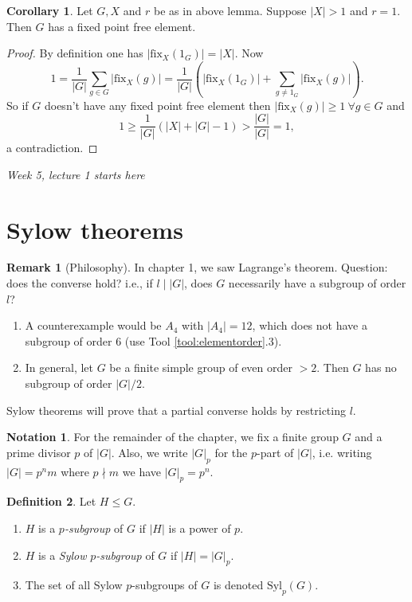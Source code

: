 \documentclass[a4paper]{article}
\newcommand{\Syl}{\text{Syl}}
\newcommand{\fix}{\text{fix}}
\theoremstyle{definition}
\newtheorem{defn}{Definition}[subsection]
\newtheorem{coro}[defn]{Corollary}
\newtheorem*{remark}{Remark}
\newtheorem*{notation}{Notation}
\begin{document}
\begin{coro}
Let $G,X$ and $r$ be as in above lemma. Suppose $|X|>1$ and $r=1$. Then $G$ has a fixed point free element.
\end{coro}
\begin{proof}
By definition one has $|\fix_X(1_G)|=|X|$. Now
\[
1=\frac{1}{|G|}\sum_{g\in G} |\fix_X(g)|=\frac{1}{|G|}\left(|\fix_X(1_G)|+\sum_{g\neq 1_G} |\fix_X(g)|\right).
\]
So if $G$ doesn't have any fixed point free element then $|\fix_X(g)|\geq 1 \ \forall g\in G$ and
\[
1\geq \frac{1}{|G|}(|X|+|G|-1)>\frac{|G|}{|G|}=1,
\]
a contradiction.
\end{proof}

\begin{flushright}
\textit{Week 5, lecture 1 starts here}
\end{flushright}

\section{Sylow theorems}
\begin{remark}[Philosophy]
In chapter 1, we saw Lagrange's theorem. Question: does the converse hold? i.e., if $l\mid |G|$, does $G$ necessarily have a subgroup of order $l$?
\begin{enumerate}
\item A counterexample would be $A_4$ with $|A_4|=12$, which does not have a subgroup of order 6 (use Tool \ref{tool:elementorder}.3).
\item In general, let $G$ be a finite simple group of even order $>2$. Then $G$ has no subgroup of order $|G|/2$.
\end{enumerate}
Sylow theorems will prove that a partial converse holds by restricting $l$.
\end{remark}

\begin{notation}
For the remainder of the chapter, we fix a finite group $G$ and a prime divisor $p$ of $|G|$. Also, we write $|G|_p$ for the $p$-part of $|G|$, i.e. writing $|G|=p^n m$ where $p\nmid m$ we have $|G|_p=p^n$.
\end{notation}

\begin{defn}
Let $H\leq G$.
\begin{enumerate}
\item $H$ is a $p$\textit{-subgroup} of $G$ if $|H|$ is a power of $p.$
\item $H$ is a \textit{Sylow} $p$\textit{-subgroup} of $G$ if $|H|=|G|_p$.
\item The set of all Sylow $p$-subgroups of $G$ is denoted $\Syl_p(G)$.
\end{enumerate}
\end{defn}
\end{document}
